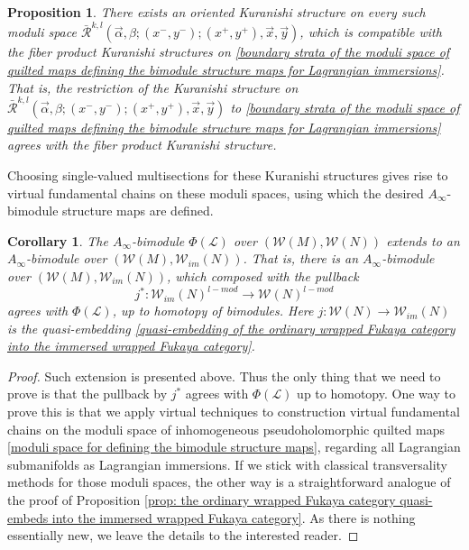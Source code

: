 \documentclass{amsart}
\newtheorem{proposition}[theorem]{Proposition}
\newtheorem{corollary}[theorem]{Corollary}
\numberwithin{equation}{section}
\numberwithin{figure}{section}
\begin{document}
\begin{proposition}
	There exists an oriented Kuranishi structure on every such moduli space $\bar{\mathcal{R}}^{k, l}(\vec{\alpha}, \beta; (x^{-}, y^{-}); (x^{+}, y^{+}), \vec{x}, \vec{y})$, which is compatible with the fiber product Kuranishi structures on \eqref{boundary strata of the moduli space of quilted maps defining the bimodule structure maps for Lagrangian immersions}. That is, the restriction of the Kuranishi structure on $\bar{\mathcal{R}}^{k, l}(\vec{\alpha}, \beta; (x^{-}, y^{-}); (x^{+}, y^{+}), \vec{x}, \vec{y})$ to \eqref{boundary strata of the moduli space of quilted maps defining the bimodule structure maps for Lagrangian immersions} agrees with the fiber product Kuranishi structure. 
\end{proposition}

	

	Choosing single-valued multisections for these Kuranishi structures gives rise to virtual fundamental chains on these moduli spaces, using which the desired $A_{\infty}$-bimodule structure maps are defined. \par

\begin{corollary}
	The $A_{\infty}$-bimodule $\Phi(\mathcal{L})$ over $(\mathcal{W}(M), \mathcal{W}(N))$ extends to an $A_{\infty}$-bimodule over $(\mathcal{W}(M), \mathcal{W}_{im}(N))$. That is, there is an $A_{\infty}$-bimodule over $(\mathcal{W}(M), \mathcal{W}_{im}(N))$, which composed with the pullback
\begin{equation*}
j^{*}: \mathcal{W}_{im}(N)^{l-mod} \to \mathcal{W}(N)^{l-mod}
\end{equation*} agrees with $\Phi(\mathcal{L})$, up to homotopy of bimodules. Here $j: \mathcal{W}(N) \to \mathcal{W}_{im}(N)$ is the quasi-embedding \eqref{quasi-embedding of the ordinary wrapped Fukaya category into the immersed wrapped Fukaya category}.
\end{corollary}
\begin{proof}
	Such extension is presented above. Thus the only thing that we need to prove is that the pullback by $j^{*}$ agrees with $\Phi(\mathcal{L})$ up to homotopy. One way to prove this is that we apply virtual techniques to construction virtual fundamental chains on the moduli space of inhomogeneous pseudoholomorphic quilted maps \eqref{moduli space for defining the bimodule structure maps}, regarding all Lagrangian submanifolds as Lagrangian immersions. If we stick with classical transversality methods for those moduli spaces, the other way is a straightforward analogue of the proof of Proposition \ref{prop: the ordinary wrapped Fukaya category quasi-embeds into the immersed wrapped Fukaya category}. As there is nothing essentially new, we leave the details to the interested reader. \par
\end{proof}
\end{document}
